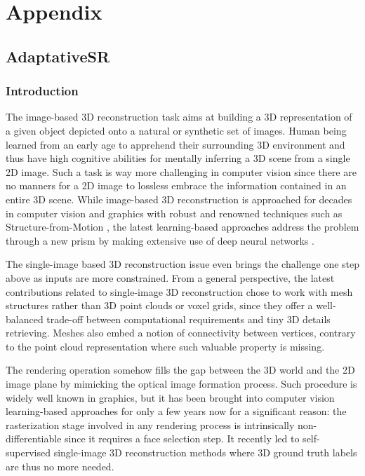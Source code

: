 \chapter{Appendix}
\label{chapter:appendix}



\section{AdaptativeSR}
\subsection{Introduction}
\label{appendix:adaptativesr-intro}

The image-based 3D reconstruction task aims at building a 3D representation of a given object depicted onto a natural or synthetic set of images. Human being learned from an early age to apprehend their surrounding 3D environment and thus have high cognitive abilities for mentally inferring a 3D scene from a single 2D image. Such a task is way more challenging in computer vision since there are no manners for a 2D image to lossless embrace the information contained in an entire 3D scene. While image-based 3D reconstruction is approached for decades in computer vision and graphics with robust and renowned techniques such as Structure-from-Motion \citep{longuet1981computer}, the latest learning-based approaches address the problem through a new prism by making extensive use of deep neural networks
\citep{kanazawa2018learning,deng2019accurate,saito2020pifuhd}.

The single-image based 3D reconstruction issue even brings the challenge one step above as inputs are more constrained. From a general perspective, the latest contributions related to single-image 3D reconstruction chose to work with mesh structures rather than 3D point clouds or voxel grids, since they offer a well-balanced trade-off between computational requirements and tiny 3D details retrieving. Meshes also embed a notion of connectivity between vertices, contrary to the point cloud representation where such valuable property is missing.

The rendering operation somehow fills the gap between the 3D world and the 2D image plane by mimicking the optical image formation process. Such procedure is widely well known in graphics, but it has been brought into computer vision learning-based approaches for only a few years now for a significant reason: the rasterization stage involved in any rendering process is intrinsically non-differentiable since it requires a face selection step. It recently led to self-supervised single-image 3D reconstruction methods where 3D ground truth labels are thus no more needed.

